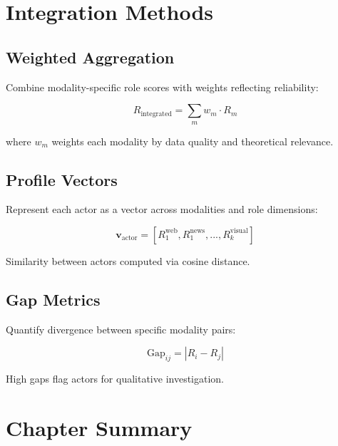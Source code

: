 \documentclass[../main.tex]{subfiles}
\begin{document}
\section*{Integration Methods}

\subsection*{Weighted Aggregation}

Combine modality-specific role scores with weights reflecting reliability:

$$R_{\text{integrated}} = \sum_{m} w_m \cdot R_m$$

where $w_m$ weights each modality by data quality and theoretical relevance.

\subsection*{Profile Vectors}

Represent each actor as a vector across modalities and role dimensions:

$$\mathbf{v}_{\text{actor}} = [R_1^{\text{web}}, R_1^{\text{news}}, ..., R_k^{\text{visual}}]$$

Similarity between actors computed via cosine distance.

\subsection*{Gap Metrics}

Quantify divergence between specific modality pairs:

$$\text{Gap}_{ij} = |R_i - R_j|$$

High gaps flag actors for qualitative investigation.


\section*{Chapter Summary}
\end{document}
